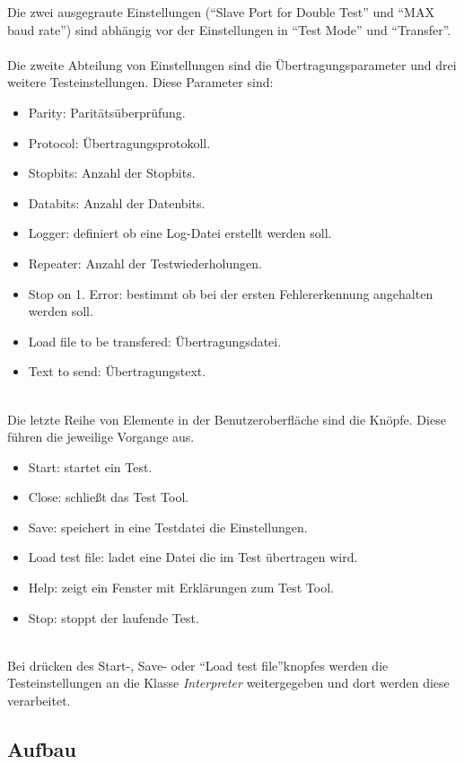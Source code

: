 Die zwei ausgegraute Einstellungen ("`Slave Port for Double Test"' und "`MAX baud rate"') sind abhängig vor der Einstellungen in "`Test Mode"' und "`Transfer"'.\\\\


Die zweite Abteilung von Einstellungen sind die Übertragungsparameter und drei weitere Testeinstellungen. Diese Parameter sind:
\begin{itemize}
\item Parity: Paritätsüberprüfung.
\item Protocol: Übertragungsprotokoll.
\item Stopbits: Anzahl der Stopbits.
\item Databits: Anzahl der Datenbits.
\item Logger: definiert ob eine Log-Datei erstellt werden soll.
\item Repeater: Anzahl der Testwiederholungen.
\item Stop on 1. Error: bestimmt ob bei der ersten Fehlererkennung angehalten werden soll.
\item Load file to be transfered: Übertragungsdatei.
\item Text to send: Übertragungstext.\\\\
\end{itemize}


Die letzte Reihe von Elemente in der Benutzeroberfläche sind die Knöpfe. Diese führen die jeweilige Vorgange aus.
\begin{itemize}
\item Start: startet ein Test.
\item Close: schließt das Test Tool.
\item Save: speichert in eine Testdatei die Einstellungen.
\item Load test file: ladet eine Datei die im Test übertragen wird.
\item Help: zeigt ein Fenster mit Erklärungen zum Test Tool.
\item Stop: stoppt der laufende Test.\\\\
\end{itemize}


Bei drücken des Start-, Save- oder "`Load test file"'knopfes werden die Testeinstellungen an die Klasse \textit{Interpreter} weitergegeben und dort werden diese verarbeitet.


\subsection{Aufbau}

